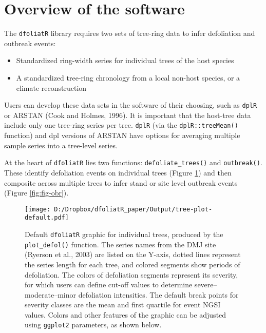 \documentclass[review]{elsarticle} %
\makeatletter
\providecommand{\tightlist}{%
  \setlength{\itemsep}{0pt}\setlength{\parskip}{0pt}}
\def\maxwidth{\ifdim\Gin@nat@width>\linewidth\linewidth
\else\Gin@nat@width\fi}
\let\Oldincludegraphics\includegraphics
\renewcommand{\includegraphics}[1]{\Oldincludegraphics[width=\maxwidth]{#1}}
\makeatother
\begin{document}
\hypertarget{overview-of-the-software}{%
\section{Overview of the software}\label{overview-of-the-software}}

The \texttt{dfoliatR} library requires two sets of tree-ring data to infer defoliation and outbreak events:

\begin{itemize}
\tightlist
\item
  Standardized ring-width series for individual trees of the host species
\item
  A standardized tree-ring chronology from a local non-host species, or a climate reconstruction
\end{itemize}

Users can develop these data sets in the software of their choosing, such as \texttt{dplR} or ARSTAN (Cook and Holmes, 1996). It is important that the host-tree data include only one tree-ring series per tree. \texttt{dplR} (via the \texttt{dplR::treeMean()} function) and dpl versions of ARSTAN have options for averaging multiple sample series into a tree-level series.

At the heart of \texttt{dfoliatR} lies two functions: \texttt{defoliate\_trees()} and \texttt{outbreak()}. These identify defoliation events on individual trees (Figure \ref{fig:fig-defol}) and then composite across multiple trees to infer stand or site level outbreak events (Figure \ref{fig:fig-obr}).



\begin{figure}
\centering
\texttt{[image: D:/Dropbox/dfoliatR\_paper/Output/tree-plot-default.pdf]}
\caption{\label{fig:fig-defol}Default \texttt{dfoliatR} graphic for individual trees, produced by the \texttt{plot\_defol()} function. The series names from the DMJ site (Ryerson et al., 2003) are listed on the Y-axis, dotted lines represent the series length for each tree, and colored segments show periods of defoliation. The colors of defoliation segments represent its severity, for which users can define cut-off values to determine severe--moderate--minor defoliation intensities. The default break points for severity classes are the mean and first quartile for event NGSI values. Colors and other features of the graphic can be adjusted using \texttt{ggplot2} parameters, as shown below.}
\end{figure}
\end{document}
